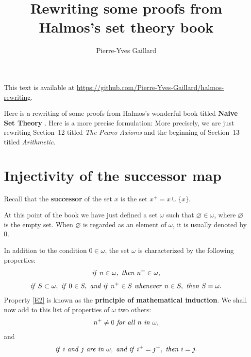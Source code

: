 \documentclass[12pt,letterpaper]{article}
\title{Rewriting some proofs from Halmos's set theory book} \author{Pierre-Yves Gaillard} \date{}
\begin{document}

\maketitle

\centerline{\scriptsize This text is available at \url{https://github.com/Pierre-Yves-Gaillard/halmos-rewriting}.} \bigskip %

Here is a rewriting of some proofs from Halmos's wonderful book titled \textbf{Naive Set Theory} \cite{halmos_naive_1974}. Here is a more precise formulation: More precisely, we are just rewriting Section~12 titled \textit{The Peano Axioms} and the beginning of Section~13 titled \textit{Arithmetic}. 

\section{Injectivity of the successor map} %

Recall that the \textbf{successor} of the set \(x\) is the set \(x^+=x\cup\{x\}\). 

At this point of the book we have just defined a set \(\omega\) such that \(\varnothing\in\omega\), where \(\varnothing\) is the empty set. When \(\varnothing\) is regarded as an element of \(\omega\), it is usually denoted by 0. 

In addition to the condition \(0\in\omega\), the set \(\omega\) is characterized by the following properties: 
\begin{equation}\label{E1}
\text{\textit{if} } n \in\omega, \text{ \textit{then} } n^{+} \in \omega,
\end{equation}
\begin{equation}\label{E2}
\text{\textit{if} }S\subset\omega,\text{ \textit{if} }0\in S,\text{ \textit{and if} }n^{+}\in S\text{ \textit{whenever} }n \in S,\text{ \textit{then} } S=\omega. 
\end{equation}
Property \eqref{E2} is known as the \textbf{principle of mathematical induction}. We shall now add to this list of properties of \(\omega\) two others: 
\begin{equation}\label{E3}
n^{+}\neq0\text{ \textit{for all} }n\text{ \textit{in} }\omega, 
\end{equation}
and
\begin{equation}\label{E4}
\text{\textit{if} }i\text{ \textit{and} }j\text{ \textit{are in} }\omega, \text{ \textit{and if} }i^{+}=j^{+}, \text{ \textit{then} }i=j. 
\end{equation}
\end{document}
